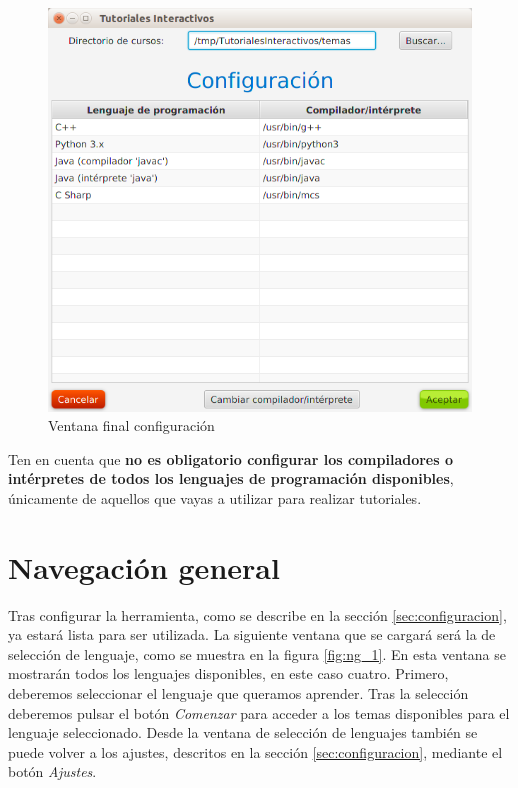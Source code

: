 \documentclass[]{article}
\begin{document}
%
\begin{figure}[tbp]
\begin{center}
\includegraphics[scale=0.4]{Configuracion_lenguajes_relleno.png}
\end{center}
\caption{Ventana final configuración\label{fig:config3}}
\end{figure}
%
Ten en cuenta que \textbf{no es obligatorio configurar los compiladores o intérpretes de todos los lenguajes de programación disponibles}, únicamente de aquellos que vayas a utilizar para realizar tutoriales.


\section{Navegación general}
\label{sec:ng}
Tras configurar la herramienta, como se describe en la sección \ref{sec:configuracion}, ya estará lista para ser utilizada. La siguiente ventana que se cargará será la de selección de lenguaje, como se muestra en la figura \ref{fig:ng_1}. En esta ventana se mostrarán todos los lenguajes disponibles, en este caso cuatro. Primero, deberemos seleccionar el lenguaje que queramos aprender. Tras la selección deberemos pulsar el botón \emph{Comenzar} para acceder a los temas disponibles para el lenguaje seleccionado. Desde la ventana de selección de lenguajes también se puede volver a los ajustes, descritos en la sección \ref{sec:configuracion}, mediante el botón \emph{Ajustes}.
\end{document}
